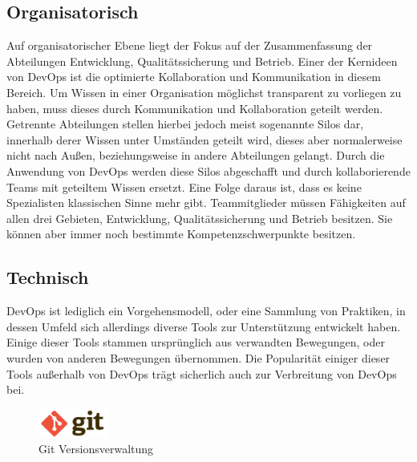 \subsection{Organisatorisch}
Auf organisatorischer Ebene liegt der Fokus auf der Zusammenfassung der Abteilungen Entwicklung, Qualitätssicherung und Betrieb. Einer der Kernideen von DevOps ist die optimierte Kollaboration und Kommunikation in diesem Bereich. Um Wissen in einer Organisation möglichst transparent zu vorliegen zu haben, muss dieses durch Kommunikation und Kollaboration geteilt werden. Getrennte Abteilungen stellen hierbei jedoch meist sogenannte Silos dar, innerhalb derer Wissen unter Umständen geteilt wird, dieses aber normalerweise nicht nach Außen, beziehungsweise in andere Abteilungen gelangt. Durch die Anwendung von DevOps werden diese Silos abgeschafft und durch kollaborierende Teams mit geteiltem Wissen ersetzt. \parencite[Vgl.][S. 8]{huettermann:2012}
Eine Folge daraus ist, dass es keine Spezialisten klassischen Sinne mehr gibt. Teammitglieder müssen Fähigkeiten auf allen drei Gebieten, Entwicklung, Qualitätssicherung und Betrieb besitzen. Sie können aber immer noch bestimmte Kompetenzschwerpunkte besitzen. \parencite[Vgl.][S. 7]{sacks:2012}

\subsection{Technisch}
DevOps ist lediglich ein Vorgehensmodell, oder eine Sammlung von Praktiken, in dessen Umfeld sich allerdings diverse Tools zur Unterstützung entwickelt haben. Einige dieser Tools stammen ursprünglich aus verwandten Bewegungen, oder wurden von anderen Bewegungen übernommen. Die Popularität einiger dieser Tools außerhalb von DevOps trägt sicherlich auch zur Verbreitung von DevOps bei.\\

\begin{figure}[ht]
  \centering
  \includegraphics[width=0.2\textwidth]{img/git_logo.png}
  \caption{Git Versionsverwaltung \parencite[][]{Git:2016}}
  \label{fig:scrummodell}
\end{figure}

